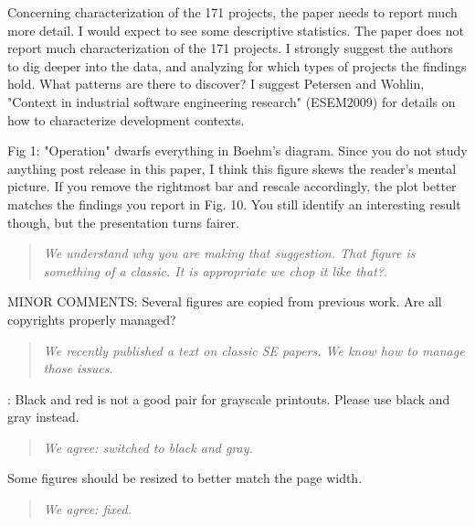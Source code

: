 Concerning characterization of the 171 projects, the
paper needs to report much more detail. I would expect to
see some descriptive statistics.   The paper does not report much
characterization of the 171 projects. I strongly suggest the
authors to dig deeper into the data, and analyzing for which
types of projects the findings hold. What patterns are there
to discover? I suggest Petersen and Wohlin, "Context in
industrial software engineering research" (ESEM2009) for
details on how to characterize development contexts.

\begin{quote}{\em Those notes are offered in  and . \end{quote}




 
Fig 1: "Operation" dwarfs everything in Boehm's diagram.
Since you do not study anything post release in this paper,
I think this figure skews the reader's mental picture. If
you remove the rightmost bar and rescale accordingly, the
plot better matches the findings you report in Fig. 10. You
still identify an interesting result though, but the
presentation turns fairer. 

\begin{quote}{\em We understand why you are making that suggestion.
That figure is something of a classic. It is appropriate we chop it like that?}.
\end{quote}

MINOR COMMENTS: 
Several figures are copied from previous work. Are all copyrights properly
managed?  

\begin{quote}{\em We recently published a text on classic SE papers. We know how to manage those issues.}\end{quote}

 

: Black and red is not a good pair for
grayscale printouts. Please use black and gray instead.
\begin{quote}{\em  We agree: switched to black and gray.  }\end{quote}

 
 
Some figures should be resized to better match the page width.  
 

\begin{quote}{\em  We agree: fixed. }\end{quote}


